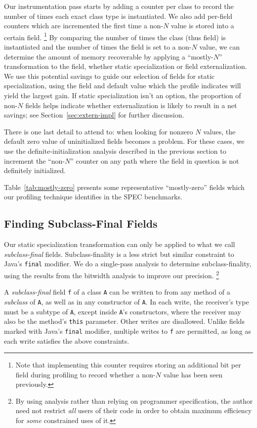 \documentclass{sig-alt-full}
\begin{document}
Our instrumentation pass starts by
adding a counter per class
to record the number of times each exact class type is instantiated.
We also add per-field counters which are incremented the first
time a non-$N$ value is stored into a certain field.%
\footnote{Note that implementing this counter requires storing an
  additional bit per field during profiling
  to record whether a non-$N$ value has been seen previously.}
By comparing the
number of times the class (thus field) is instantiated and the number
of times the field is set to a non-$N$ value, we can determine the
amount of memory recoverable by applying a ``mostly-$N$''
transformation to the field, whether static specialization or field
externalization.  We use this potential savings to guide our selection
of fields for static specialization, using the field and default value
which the profile indicates will yield the largest gain.  If static
specialization isn't an option, the
proportion of non-$N$ fields helps indicate whether externalization is
likely to result in a net savings; see Section~\ref{sec:extern-impl}
for further discussion.

There is one last detail to attend to:  when looking for nonzero $N$
values, the default zero value of
uninitialized fields becomes a problem.  For these cases, we use the
definite-initialization analysis described in the previous section to
increment the
``non-$N$'' counter on any path where the field in question is not
definitely initialized.

Table~\ref{tab:mostly-zero} presents some representative
``mostly-zero'' fields which our profiling technique identifies in the
SPEC benchmarks.

\subsection{Finding Subclass-Final Fields}
\label{sec:subclass-final}
Our static specialization transformation can only be applied to what
we call {\it subclass-final} fields.  Subclass-finality is a less strict
but similar constraint to Java's {\tt final} modifier.  We do a
single-pass analysis to determine subclass-finality, using the results
from the bitwidth analysis to improve our precision.%
\footnote{By using analysis rather than relying on programmer
  specification, the author need not restrict \emph{all} users of
  their code in order to obtain maximum efficiency for \emph{some}
  constrained uses of it.}

A \emph{subclass-final} field {\tt f} of a class {\tt A} can be
written to from any method of a \emph{subclass} of {\tt A}, as well as
in any constructor of {\tt A}.  In each write, the receiver's type
must be a subtype of {\tt A}, except inside {\tt A}'s constructors,
where the receiver may also be the method's {\tt this} parameter.
Other writes are disallowed.  Unlike fields marked with Java's
{\tt final} modifier,
multiple writes to {\tt f} are permitted, as long as each write
satisfies the above constraints.
\end{document}
